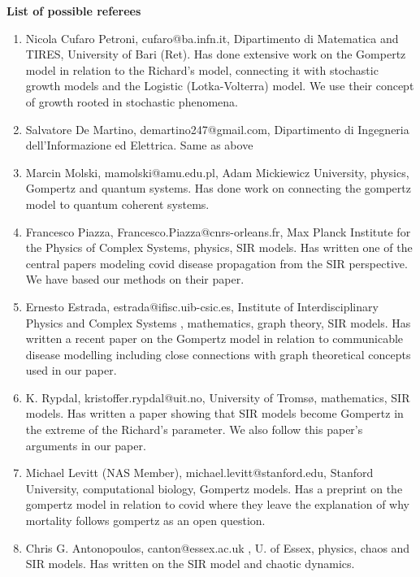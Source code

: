 \documentclass[11pt,a4paper,roman]{moderncv}
\begin{document}
\textbf{List of possible referees}
\begin{enumerate}

\item Nicola Cufaro Petroni, cufaro@ba.infn.it,
Dipartimento di Matematica and TIRES, University of Bari (Ret).
Has done extensive work on the Gompertz model in relation to the Richard's model, connecting it with stochastic growth models and the Logistic (Lotka-Volterra) model. We use their concept of growth rooted in stochastic phenomena.
\item Salvatore De Martino,
demartino247@gmail.com, 
Dipartimento di Ingegneria dell’Informazione ed Elettrica.
Same as above
\item Marcin Molski, mamolski@amu.edu.pl, Adam Mickiewicz University, physics, Gompertz and quantum systems. Has done work on connecting the gompertz model to quantum coherent systems.
\item Francesco Piazza, Francesco.Piazza@cnrs-orleans.fr, Max Planck Institute for the Physics of Complex Systems, physics, SIR models.
Has written one of the central papers modeling covid disease propagation from the SIR perspective. We have based our methods on their paper.
\item Ernesto Estrada, estrada@ifisc.uib-csic.es, Institute of Interdisciplinary Physics and Complex Systems , mathematics, graph theory, SIR models.
Has written a recent paper on the Gompertz model in relation to communicable disease modelling including close connections with graph theoretical concepts used in our paper. 
\item K. Rypdal, kristoffer.rypdal@uit.no, University of Tromsø, mathematics, SIR models.
Has written a paper showing that SIR models become Gompertz in the extreme of the Richard's parameter. We also follow this paper's arguments in our paper.
\item Michael Levitt (NAS Member), michael.levitt@stanford.edu, Stanford University, computational biology, Gompertz models.
Has a preprint on the gompertz model in relation to covid where they leave the explanation of why mortality follows gompertz as an open question.
\item Chris G. Antonopoulos, canton@essex.ac.uk , U. of Essex, physics, chaos and SIR models.
Has written on the SIR model and chaotic dynamics.

\end{enumerate}
\end{document}
